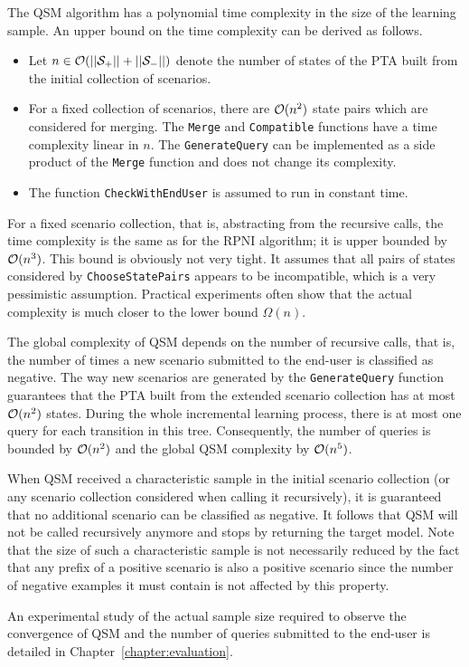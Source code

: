 The QSM algorithm has a polynomial time complexity in the size of the learning sample. An upper bound on the time complexity can be derived as follows.
\begin{itemize}
\item Let $n\in \cal{O}(||S_+||+||S_-||)$ denote the number of states of the PTA built from the initial collection of scenarios. 
\item For a fixed collection of scenarios, there are ${\cal O}(n^2)$ state pairs which are considered for merging.
The \texttt{Merge} and \texttt{Compatible} functions have a time complexity linear in $n$. The \texttt{GenerateQuery} can be implemented as a side product of the \texttt{Merge} function and does not change its complexity.
\item The function \texttt{CheckWithEndUser} is assumed to run in constant time.
\end{itemize}

For a fixed scenario collection, that is, abstracting from the recursive calls, the time complexity is the same as for the RPNI algorithm; it is upper bounded by ${\cal O}(n^3)$. This bound is obviously not very tight. It assumes that all pairs of states considered by \texttt{ChooseStatePairs} appears to be incompatible,  which is a very pessimistic assumption. Practical experiments often show that the actual complexity is much closer to the lower bound $\Omega(n)$. 

The global complexity of QSM depends on the number of recursive calls, that is, the number of times a new scenario
submitted to the end-user is classified as negative. The way new scenarios are generated by the \texttt{GenerateQuery} function guarantees that the PTA built from the extended scenario collection has at most ${\cal O}(n^2)$ states.
During the whole incremental learning process, there is at most one query for each transition in this tree.  Consequently, the number of queries is bounded by ${\cal O}(n^2)$ and the global QSM complexity by ${\cal O}(n^5)$.

When QSM received a characteristic sample in the initial scenario collection (or any scenario collection considered when calling it recursively), it is guaranteed that no additional scenario can be classified as negative.
It follows that QSM will not be called recursively anymore and stops by returning the target model. Note that the size of such a characteristic sample is not necessarily reduced by the fact that any prefix of a positive scenario is also a positive scenario since the number of negative examples it must contain is not affected by this property. 

An experimental study of the actual sample size required to observe the convergence of \textsc{QSM} and the number of queries submitted to the end-user is detailed in Chapter~\ref{chapter:evaluation}.
